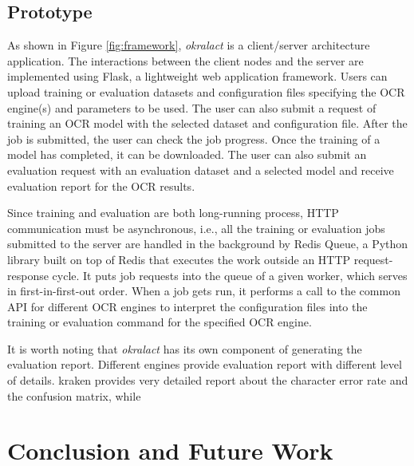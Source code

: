 \documentclass[conference]{IEEEtran}
\begin{document}
\subsection{Prototype}
\label{sec:prototype}

As shown in Figure \ref{fig:framework}, \textit{okralact} is a client/server
architecture application. The interactions between the client nodes and the
server are implemented using Flask, a lightweight web application framework.
Users can upload training or evaluation datasets and configuration files
specifying the OCR engine(s) and parameters to be used. The user can also
submit a request of training an OCR model with the selected dataset and
configuration file. After the job is submitted, the user can check the job
progress. Once the training of a model has completed, it can be downloaded.
The user can also submit an evaluation request with an evaluation dataset and
a selected model and receive evaluation report for the OCR results. 



Since training and evaluation are both long-running process, HTTP communication must be asynchronous,
i.e., all the training or evaluation
jobs submitted to the server are handled in the background by Redis Queue,
a Python library built on top of Redis that
executes the work outside an HTTP request-response cycle. It puts job
requests into the queue of a given worker, which serves in
first-in-first-out order. When a job gets run, it performs a call to the common
API for different OCR engines to interpret the configuration files into the
training or evaluation command for the specified OCR engine. 

It is worth noting that \textit{okralact} has its own component of generating the evaluation report. Different engines provide evaluation report with different level of details. kraken provides very detailed report about the character error rate and the confusion matrix, while  


\section{Conclusion and Future Work}
\end{document}
